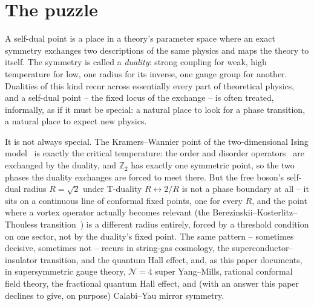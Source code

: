\documentclass[11pt,a4paper]{article}
\begin{document}
\begin{abstract}
same reproduction shows that no future CMB temperature experiment can meaningfully tighten this
particular bound: Planck's own error bars sit within about $13\%$ of the cosmic-variance floor where the
signal peaks for most transition rates ($5\le\ell<30$) and within a factor of two at every multipole up to
$\ell=50$, so, since the bound scales as the square root of the error bar, even a perfect temperature
measurement could tighten it by at most about $1.4\times$. Twelve of these sixteen candidates receive
one of the criterion's four verdicts; three are, on inspection, not instances of the criterion at all
-- a classification (topological superconductors), a duality between different theories with no
self-map (three-dimensional Ising duality, AdS/CFT) -- and one, Calabi--Yau mirror symmetry, is left an
open question rather than forced into a verdict the literature does not support. Reporting these honestly is part of the theory's
claim to be checked, not merely asserted.
\end{abstract}

\section{The puzzle}

A self-dual point is a place in a theory's parameter space where an exact symmetry exchanges two
descriptions of the same physics and maps the theory to itself. The symmetry is called a
\emph{duality}: strong coupling for weak, high temperature for low, one radius for its inverse, one
gauge group for another. Dualities of this kind recur across essentially every part of theoretical
physics, and a self-dual point -- the fixed locus of the exchange -- is often treated, informally, as
if it must be special: a natural place to look for a phase transition, a natural place to expect new
physics.

It is not always special. The Kramers--Wannier point of the two-dimensional Ising
model~\cite{KramersWannier1941} is exactly the critical temperature: the order and disorder
operators~\cite{FradkinSusskind1978} are exchanged by the duality, and $\mathbb Z_2$ has exactly one
symmetric point, so the two phases the duality exchanges are forced to meet there. But the free
boson's self-dual radius $R=\sqrt2$ under T-duality $R\leftrightarrow2/R$ is not a phase boundary at
all -- it sits on a continuous line of conformal fixed points, one for every $R$, and the point where
a vortex operator actually becomes relevant (the Berezinskii--Kosterlitz--Thouless
transition~\cite{NelsonKosterlitz1977}) is a different radius entirely, forced by a threshold
condition on one sector, not by the duality's fixed point. The same pattern -- sometimes decisive,
sometimes not -- recurs in string-gas cosmology, the superconductor--insulator transition, and the
quantum Hall effect, and, as this paper documents, in supersymmetric gauge theory, $\mathcal N=4$
super Yang--Mills, rational conformal field theory, the fractional quantum Hall effect, and (with an
answer this paper declines to give, on purpose) Calabi--Yau mirror symmetry.
\end{document}
